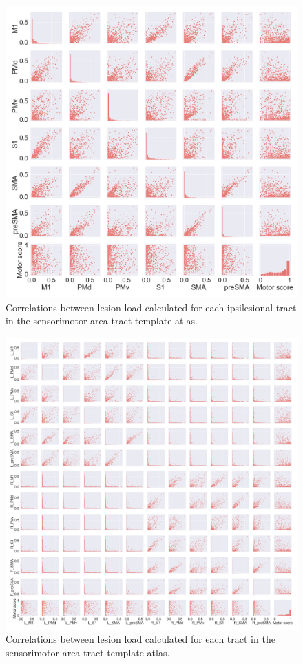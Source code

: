 \documentclass[10pt]{article}
\begin{document}
\begin{figure}[ht]
\centering
\includegraphics[width=0.8\linewidth]{figures/SMATT_scatterplts.png}
\caption{Correlations between lesion load calculated for each ipsilesional tract in the sensorimotor area tract template atlas.}
\label{smatt_pairwise_correlations}
\end{figure}


\begin{figure}[ht]
\centering
\includegraphics[width=1\linewidth]{figures/SMATT_bi_scatterplts.png}
\caption{Correlations between lesion load calculated for each tract in the sensorimotor area tract template atlas.}
\label{smatt_pairwise_correlations_bi}
\end{figure}
\end{document}
